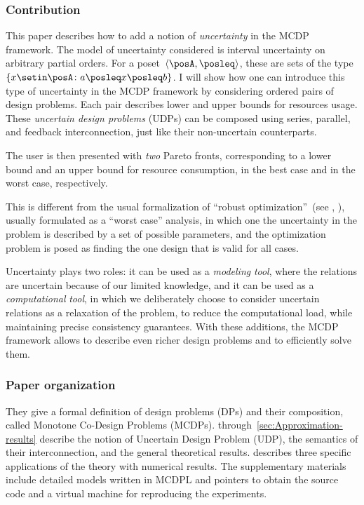 \subsubsection*{Contribution}

This paper describes how to add a notion of \emph{uncertainty} in the MCDP framework.
The model of uncertainty considered is interval uncertainty on arbitrary partial orders.
For a poset~$\left\langle \posA,\posleq\right\rangle $, these are sets of the type~$\{x\setin\posA\colon a\posleq x\posleq b\}$.
I will show how one can introduce this type of uncertainty in the MCDP framework by considering ordered pairs of design problems.
Each pair describes lower and upper bounds for resources usage.
These \emph{uncertain design problems} (UDPs) can be composed using series, parallel, and feedback interconnection, just like their non-uncertain counterparts.

The user is then presented with \emph{two} Pareto fronts, corresponding to a lower bound and an upper bound for resource consumption, in the best case and in the worst case, respectively.

This is different from the usual formalization of ``robust optimization''~(see \eg , \cite{bertsimas11theory,ben-tal09}), usually formulated as a ``worst case'' analysis, in which one the uncertainty in the problem is described by a set of possible parameters, and the optimization problem is posed as finding the one design that is valid for all cases.

Uncertainty plays two roles: it can be used as a \emph{modeling} \emph{tool}, where the relations are uncertain because of our limited knowledge, and it can be used as a \emph{computational} \emph{tool}, in which we deliberately choose to consider uncertain relations as a relaxation of the problem, to reduce the computational load, while maintaining precise consistency guarantees.
With these additions, the MCDP framework allows to describe even richer design problems and to efficiently solve them.

\subsubsection*{Paper organization}


They give a formal definition of design problems
(DPs) and their composition, called Monotone Co-Design Problems (MCDPs).
 through~\cref{sec:Approximation-results}
describe the notion of Uncertain Design Problem (UDP), the semantics of their interconnection, and the general theoretical results.
 describes three specific applications of the theory with numerical results.
The supplementary materials include detailed models written in MCDPL and pointers to obtain the source code and a virtual machine for reproducing the experiments.

